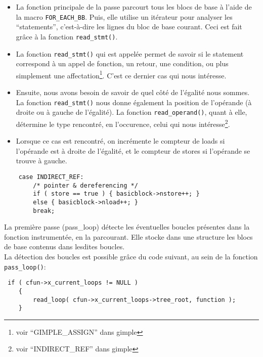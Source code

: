 \begin{itemize}

\item La fonction principale de la passe parcourt tous les blocs de base à l'aide de la macro \verb#FOR_EACH_BB#. Puis, elle utilise un itérateur pour analyser les ``statements'', c'est-à-dire les lignes du bloc de base courant. Ceci est fait grâce à la fonction \verb#read_stmt()#.\\

\item La fonction \verb#read_stmt()# qui est appelée permet de savoir si le statement correspond à un appel de fonction, un retour, une condition, ou plus simplement une affectation\footnote{voir ``GIMPLE\_ASSIGN'' dans gimple}. C'est ce dernier cas qui nous intéresse.\\

\item Ensuite, nous avons besoin de savoir de quel côté de l'égalité nous sommes. La fonction \verb#read_stmt()# nous donne également la position de l'opérande (à droite ou à gauche de l'égalité). La fonction \verb#read_operand()#, quant à elle, détermine le type rencontré, en l'occurence, celui qui nous intéresse\footnote{voir ``INDIRECT\_REF'' dans gimple}.\\

\item Lorsque ce cas est rencontré, on incrémente le compteur de loads si l'opérande est à droite de l'égalité, et le compteur de stores si l'opérande se trouve à gauche.\\

\end{itemize}

\begin{verbatim}
	case INDIRECT_REF:
	    /* pointer & dereferencing */
	    if ( store == true ) { basicblock->nstore++; }
	    else { basicblock->nload++; }
	    break;
\end{verbatim}

La première passe (pass\_loop) détecte les éventuelles boucles présentes dans la fonction instrumentée, en la parcourant. Elle stocke dans une structure les blocs de base contenus dans lesdites boucles.\\
La détection des boucles est possible grâce du code suivant, au sein de la fonction \verb#pass_loop()#:
\begin{verbatim}
 if ( cfun->x_current_loops != NULL )
	{
	    read_loop( cfun->x_current_loops->tree_root, function );
	}
\end{verbatim}

